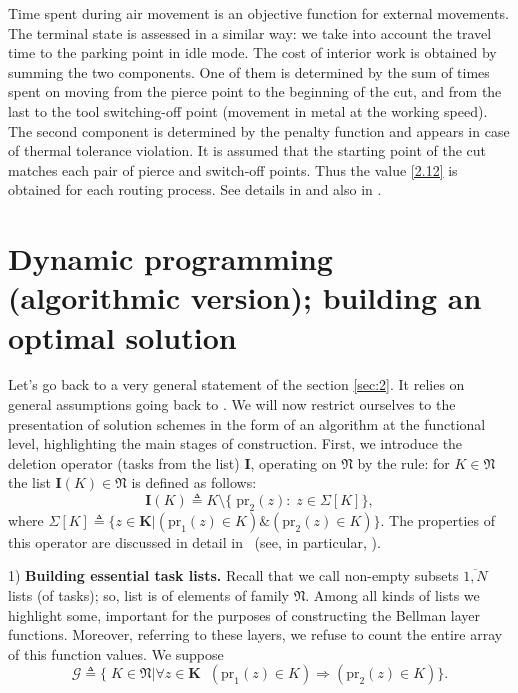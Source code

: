 \documentclass[10pt]{article}
\begin{document}
Time spent during air movement
is an
objective function for external movements.
The terminal state is assessed in a similar way:
we take into account the travel time to the parking point
in idle mode.
The cost of interior work
is obtained by summing the two components.
One of them is determined by the sum of times
spent on moving
from the pierce point  to the beginning of the cut,
and from the last to the tool switching-off point
(movement in metal at the working speed).
The second component is determined by the penalty function and
appears in case of thermal tolerance violation.
It is assumed that the starting point of the cut
matches each pair
of pierce and switch-off points.
Thus
the value \eqref {2.12}
is obtained
for each routing process.
See details in
\cite[part 1, chapter 3]{4}
and also in
\cite{18}.

\section{%
Dynamic programming
(algorithmic version);
building an optimal solution%
}
\label{sec:4}

Let's go back to a very general statement of the section
\ref{sec:2}.
It relies on general assumptions going back to
\cite[$\S$4.9]{14}.
We will now restrict ourselves to the presentation of
solution schemes
in the form of an algorithm at the functional level,
highlighting the main stages of construction.
First,
we introduce the deletion operator
(tasks from the list)
$\mathbf{I}$,
operating on $\mathfrak{N}$
by the rule:
for
$K \in \mathfrak{N}$
the list
$\mathbf{I}(K) \in \mathfrak{N}$
is defined as follows:
\begin{equation}\label{4.1}
  \mathbf{I}(K) {\triangleq} K \setminus \{\;\mathrm{pr}_2(z):\;z \in \Sigma[K]\},
\end{equation}
where
$\Sigma[K] {\triangleq} \{z \in \mathbf{K} \vert (\mathrm{pr}_1(z) \in K) \& (\mathrm{pr}_2(z) \in K)\}.$
The properties of this operator are discussed in detail in~\cite[part 2]{14}
(see, in particular, \cite[$\S 2.2$]{14}).

1) {\bf Building essential task lists.}
Recall
that we call
non-empty subsets
$ \overline {1, N} $
lists
(of tasks);
so,
list is of elements of family
$\mathfrak{N}$.
Among all kinds of lists
we highlight some,
important for the purposes of constructing the Bellman layer functions.
Moreover,
referring to these layers,
we refuse to count the entire array of
this function values.
We suppose
\begin{equation}\label{4.2}
  \mathcal{G} {\triangleq} \{\;K \in \mathfrak{N} \vert
  \forall{z} \in \mathbf{K}\;\;(\mathrm{pr}_1(z) \in K) \Longrightarrow (\mathrm{pr}_2(z) \in K)\}.
\end{equation}
\end{document}
